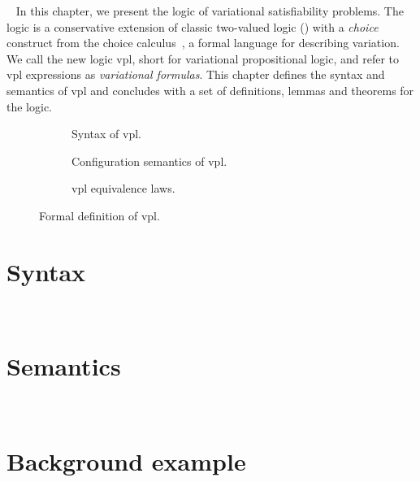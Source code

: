 ~\label{chapter:vpl}
%
In this chapter, we present the logic of variational satisfiability problems.
%
The logic is a conservative extension of classic two-valued logic (\pl{})
with a \emph{choice} construct from the choice
calculus~\cite{EW11tosem,Walk13thesis}, a formal language for describing
variation. We call the new logic \acs{vpl}, short for variational propositional
logic, and refer to \ac{vpl} expressions as \emph{variational formulas}.
%
This chapter defines the syntax and semantics of \ac{vpl} and concludes with a
set of definitions, lemmas and theorems for the logic.
%
\begin{figure}
  \begin{subfigure}[t]{\linewidth}
    \centering
    
    \caption{Syntax of \ac{vpl}.}%
    \label{fig:cc:stx}
  \end{subfigure}
%
  \begin{subfigure}[t]{\linewidth}
    
    \centering
    \caption{Configuration semantics of \ac{vpl}.}%
    \label{fig:cc:cfg}
  \end{subfigure}
%
  \begin{subfigure}[t]{\linewidth}
    
    \centering
    \caption{\ac{vpl} equivalence laws.}%
    \label{fig:cc:eqv}
  \end{subfigure}
\caption{Formal definition of \ac{vpl}.}%
\label{fig:cc}
\end{figure}
%
%
\section{Syntax}
~\label{section:syntax}


\section{Semantics}
~\label{section:semantics}


\section{Background example}
~\label{section:background}



